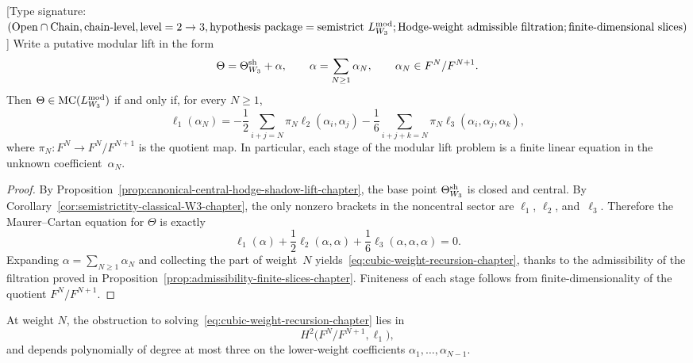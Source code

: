 \begin{theorem}
\label{thm:cubic-weight-recursion-chapter}
\textup{[}Type signature:
$(\mathrm{Open}\cap\mathrm{Chain},\mathrm{chain\text{-}level},
\mathrm{level}=2\to 3,
\mathrm{hypothesis\ package}=
\mathrm{semistrict\ }L_{W_3}^{\mathrm{mod}};
\mathrm{Hodge\text{-}weight\ admissible\ filtration};
\mathrm{finite\text{-}dimensional\ slices})$\textup{]}
Write a putative modular lift in the form
\[
\Theta
=
\Theta_{W_3}^{\mathrm{sh}}+\alpha,
\qquad
\alpha=\sum_{N\ge1}\alpha_N,
\qquad
\alpha_N\in F^N/F^{N+1}.
\]
Then $\Theta\in \operatorname{MC}(L_{W_3}^{\mathrm{mod}})$ if and only if, for every $N\ge1$,
\begin{equation}
\label{eq:cubic-weight-recursion-chapter}
\ell_1(\alpha_N)
=
-\frac12\sum_{i+j=N}\pi_N\ell_2(\alpha_i,\alpha_j)
-\frac16\sum_{i+j+k=N}\pi_N\ell_3(\alpha_i,\alpha_j,\alpha_k),
\end{equation}
where $\pi_N:F^N\to F^N/F^{N+1}$ is the quotient map. In particular, each stage of the modular lift problem is a finite linear equation in the unknown coefficient~$\alpha_N$.
\end{theorem}

\begin{proof}
By Proposition~\ref{prop:canonical-central-hodge-shadow-lift-chapter}, the base point $\Theta_{W_3}^{\mathrm{sh}}$ is closed and central. By Corollary~\ref{cor:semistrictity-classical-W3-chapter}, the only nonzero brackets in the noncentral sector are $\ell_1$, $\ell_2$, and~$\ell_3$. Therefore the Maurer--Cartan equation for $\Theta$ is exactly
\[
\ell_1(\alpha)+\frac12\ell_2(\alpha,\alpha)+\frac16\ell_3(\alpha,\alpha,\alpha)=0.
\]
Expanding $\alpha=\sum_{N\ge1}\alpha_N$ and collecting the part of weight~$N$ yields~\eqref{eq:cubic-weight-recursion-chapter}, thanks to the admissibility of the filtration proved in Proposition~\ref{prop:admissibility-finite-slices-chapter}. Finiteness of each stage follows from finite-dimensionality of the quotient $F^N/F^{N+1}$.\qedhere
\end{proof}

\begin{corollary}
\label{cor:cubic-obstruction-classes-chapter}
At weight $N$, the obstruction to solving~\eqref{eq:cubic-weight-recursion-chapter} lies in
\[
H^2\bigl(F^N/F^{N+1},\ell_1\bigr),
\]
and depends polynomially of degree at most three on the lower-weight coefficients $\alpha_1,\dots,\alpha_{N-1}$.
\end{corollary}

